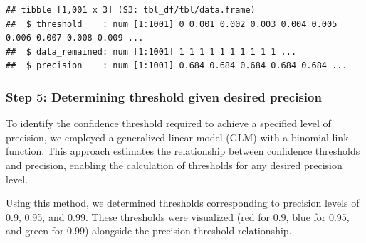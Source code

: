 \documentclass[
]{article}
\newenvironment{Shaded}{\begin{snugshade}}{\end{snugshade}}
\newcommand{\AttributeTok}[1]{\textcolor[rgb]{0.13,0.29,0.53}{#1}}
\newcommand{\CommentTok}[1]{\textcolor[rgb]{0.56,0.35,0.01}{\textit{#1}}}
\newcommand{\ControlFlowTok}[1]{\textcolor[rgb]{0.13,0.29,0.53}{\textbf{#1}}}
\newcommand{\DecValTok}[1]{\textcolor[rgb]{0.00,0.00,0.81}{#1}}
\newcommand{\FunctionTok}[1]{\textcolor[rgb]{0.13,0.29,0.53}{\textbf{#1}}}
\newcommand{\NormalTok}[1]{#1}
\newcommand{\OtherTok}[1]{\textcolor[rgb]{0.56,0.35,0.01}{#1}}
\newcommand{\SpecialCharTok}[1]{\textcolor[rgb]{0.81,0.36,0.00}{\textbf{#1}}}
\begin{document}
\begin{verbatim}
## tibble [1,001 x 3] (S3: tbl_df/tbl/data.frame)
##  $ threshold    : num [1:1001] 0 0.001 0.002 0.003 0.004 0.005 0.006 0.007 0.008 0.009 ...
##  $ data_remained: num [1:1001] 1 1 1 1 1 1 1 1 1 1 ...
##  $ precision    : num [1:1001] 0.684 0.684 0.684 0.684 0.684 ...
\end{verbatim}

\subsubsection{Step 5: Determining threshold given desired
precision}\label{step-5-determining-threshold-given-desired-precision}

To identify the confidence threshold required to achieve a specified
level of precision, we employed a generalized linear model (GLM) with a
binomial link function. This approach estimates the relationship between
confidence thresholds and precision, enabling the calculation of
thresholds for any desired precision level.

\begin{Shaded}
\end{Shaded}

Using this method, we determined thresholds corresponding to precision
levels of 0.9, 0.95, and 0.99. These thresholds were visualized (red for
0.9, blue for 0.95, and green for 0.99) alongside the
precision-threshold relationship.
\end{document}
